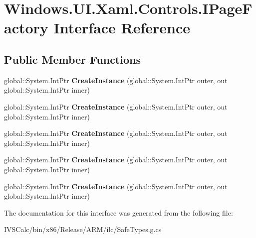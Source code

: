 \hypertarget{interface_windows_1_1_u_i_1_1_xaml_1_1_controls_1_1_i_page_factory}{}\section{Windows.\+U\+I.\+Xaml.\+Controls.\+I\+Page\+Factory Interface Reference}
\label{interface_windows_1_1_u_i_1_1_xaml_1_1_controls_1_1_i_page_factory}
\subsection*{Public Member Functions}
\begin{DoxyCompactItemize}
\item 
\mbox{\label{interface_windows_1_1_u_i_1_1_xaml_1_1_controls_1_1_i_page_factory_a6c0e4f30c852b1b8add43154d82ed58e}} 
global\+::\+System.\+Int\+Ptr {\bfseries Create\+Instance} (global\+::\+System.\+Int\+Ptr outer, out global\+::\+System.\+Int\+Ptr inner)
\item 
\mbox{\label{interface_windows_1_1_u_i_1_1_xaml_1_1_controls_1_1_i_page_factory_a6c0e4f30c852b1b8add43154d82ed58e}} 
global\+::\+System.\+Int\+Ptr {\bfseries Create\+Instance} (global\+::\+System.\+Int\+Ptr outer, out global\+::\+System.\+Int\+Ptr inner)
\item 
\mbox{\label{interface_windows_1_1_u_i_1_1_xaml_1_1_controls_1_1_i_page_factory_a6c0e4f30c852b1b8add43154d82ed58e}} 
global\+::\+System.\+Int\+Ptr {\bfseries Create\+Instance} (global\+::\+System.\+Int\+Ptr outer, out global\+::\+System.\+Int\+Ptr inner)
\item 
\mbox{\label{interface_windows_1_1_u_i_1_1_xaml_1_1_controls_1_1_i_page_factory_a6c0e4f30c852b1b8add43154d82ed58e}} 
global\+::\+System.\+Int\+Ptr {\bfseries Create\+Instance} (global\+::\+System.\+Int\+Ptr outer, out global\+::\+System.\+Int\+Ptr inner)
\item 
\mbox{\label{interface_windows_1_1_u_i_1_1_xaml_1_1_controls_1_1_i_page_factory_a6c0e4f30c852b1b8add43154d82ed58e}} 
global\+::\+System.\+Int\+Ptr {\bfseries Create\+Instance} (global\+::\+System.\+Int\+Ptr outer, out global\+::\+System.\+Int\+Ptr inner)
\end{DoxyCompactItemize}


The documentation for this interface was generated from the following file\+:\begin{DoxyCompactItemize}
\item 
I\+V\+S\+Calc/bin/x86/\+Release/\+A\+R\+M/ilc/Safe\+Types.\+g.\+cs\end{DoxyCompactItemize}
